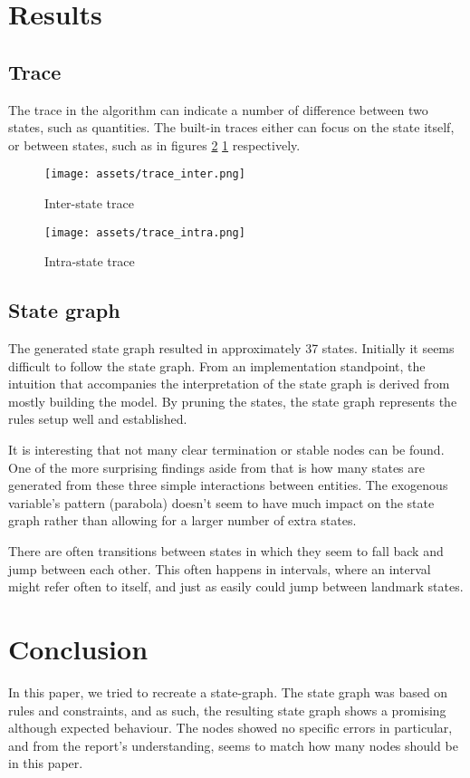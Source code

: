 \section{Results}
\subsection{Trace}
The trace in the algorithm can indicate a number of difference between two
states, such as quantities. The built-in traces either can focus on the state
itself, or between states, such as in figures \ref{fig:trace_intra.png}
\ref{fig:trace_inter.png} respectively.

\begin{figure}
    \texttt{[image: assets/trace\_inter.png]}
    \caption{Inter-state trace}
    \label{fig:trace_inter.png}
\end{figure}

\begin{figure}
    \texttt{[image: assets/trace\_intra.png]}
    \caption{Intra-state trace}
    \label{fig:trace_intra.png}
\end{figure}

\subsection{State graph}
The generated state graph resulted in approximately 37 states. Initially it
seems difficult to follow the state graph. From an implementation standpoint,
the intuition that accompanies the interpretation of the state graph is derived
from mostly building the model. By pruning the states, the state graph
represents the rules setup well and established.

It is interesting that not many clear termination or stable nodes can be found.
One of the more surprising findings aside from that is how many states are
generated from these three simple interactions between entities. The exogenous
variable's pattern (parabola) doesn't seem to have much impact on the state
graph rather than allowing for a larger number of extra states. 

There are often transitions between states in which they seem to fall back and
jump between each other. This often happens in intervals, where an interval
might refer often to itself, and just as easily could jump between landmark
states.

\section{Conclusion}
In this paper, we tried to recreate a state-graph. The state graph was based on
rules and constraints, and as such, the resulting state graph shows a promising 
although expected behaviour. The nodes showed no specific errors in particular, 
and from the report's understanding, seems to match how many nodes should be in 
this paper.